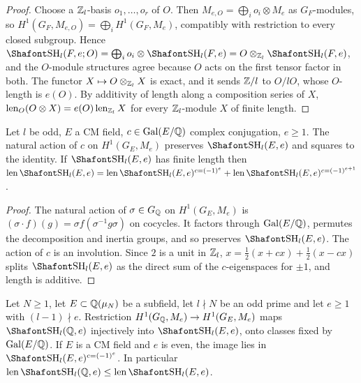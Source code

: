\begin{proof}
Choose a $\mathbb Z_l$-basis $o_1,\dots,o_r$ of $O$. Then $M_{e,O}=\bigoplus_i o_i\otimes M_e$ as $G_F$-modules, so $H^1(G_F,M_{e,O})=\bigoplus_iH^1(G_F,M_e)$, compatibly with restriction to every closed subgroup. Hence $\Sha_l(F,e;O)=\bigoplus_io_i\otimes\Sha_l(F,e)=O\otimes_{\Zl}\Sha_l(F,e)$, and the $O$-module structures agree because $O$ acts on the first tensor factor in both. The functor $X\mapsto O\otimes_{\mathbb Z_l}X$ is exact, and it sends $\mathbb Z/l$ to $O/lO$, whose $O$-length is $e(O)$. By additivity of length along a composition series of $X$, $\operatorname{len}_O(O\otimes X)=e(O)\operatorname{len}_{\mathbb Z_l}X$ for every $\mathbb Z_l$-module $X$ of finite length.
\end{proof}

\begin{lemma}\label{w4:lem:pm}
Let $l$ be odd, $E$ a CM field, $c\in\operatorname{Gal}(E/\mathbb Q)$ complex conjugation, $e\ge1$. The natural action of $c$ on $H^1(G_E,M_e)$ preserves $\Sha_l(E,e)$ and squares to the identity. If $\Sha_l(E,e)$ has finite length then $\len\Sha_l(E,e)=\len\Sha_l(E,e)^{c=(-1)^e}+\len\Sha_l(E,e)^{c=(-1)^{e+1}}$.
\end{lemma}

\begin{proof}
The natural action of $\sigma\in G_\mathbb Q$ on $H^1(G_E,M_e)$ is $(\sigma\cdot f)(g)=\sigma f(\sigma^{-1}g\sigma)$ on cocycles. It factors through $\operatorname{Gal}(E/\mathbb Q)$, permutes the decomposition and inertia groups, and so preserves $\Sha_l(E,e)$. The action of $c$ is an involution. Since $2$ is a unit in $\mathbb Z_l$, $x=\frac12(x+cx)+\frac12(x-cx)$ splits $\Sha_l(E,e)$ as the direct sum of the $c$-eigenspaces for $\pm1$, and length is additive.
\end{proof}

\begin{proposition}\label{w4:prop:res}
Let $N\ge1$, let $E\subset\mathbb Q(\mu_N)$ be a subfield, let $l\nmid N$ be an odd prime and let $e\ge1$ with $(l-1)\nmid e$. Restriction $H^1(G_\mathbb Q,M_e)\to H^1(G_E,M_e)$ maps $\Sha_l(\Q,e)$ injectively into $\Sha_l(E,e)$, onto classes fixed by $\operatorname{Gal}(E/\mathbb Q)$. If $E$ is a CM field and $e$ is even, the image lies in $\Sha_l(E,e)^{c=(-1)^e}$. In particular $\len\Sha_l(\Q,e)\le\len\Sha_l(E,e)$.
\end{proposition}

